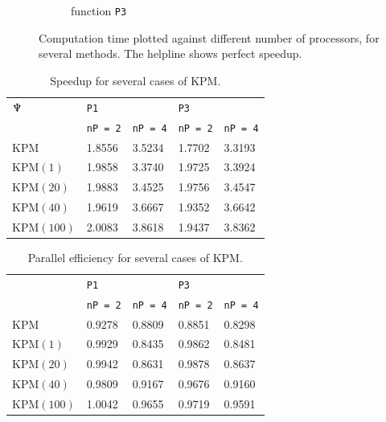 \begin{figure}[H]
\begin{subfigure}[b]{0.45\textwidth}
                \caption{function \texttt{P3}}
                \label{fig:speed2}
        \end{subfigure}
        \caption{Computation time plotted against different number of processors, for several methods. The helpline shows perfect speedup.}\label{fig:speed}

\end{figure}

\begin{table}[H]
\centering
\begin{tabular}{l | l l | l l}
$\neptune$ %
 &\texttt{P1} & & \texttt{P3} & \\
&\texttt{nP = 2} & \texttt{nP = 4} & \texttt{nP = 2} & \texttt{nP = 4} \\
\hline
KPM & 1.8556  &  3.5234 & 1.7702&    3.3193\\
KPM$(1)$ & 1.9858  &  3.3740 & 1.9725&    3.3924\\
KPM$(20)$ & 1.9883  &  3.4525 & 1.9756&    3.4547\\
KPM$(40)$ & 1.9619  &  3.6667 & 1.9352&   3.6642\\
KPM$(100)$ & 2.0083  &  3.8618 & 1.9437&    3.8362\\
\end{tabular}
\caption{Speedup for several cases of KPM.}
\label{tab:speedup}
\end{table}

\begin{table}[H]
\centering
\begin{tabular}{l | l l | l l}
&\texttt{P1} & & \texttt{P3} & \\
&\texttt{nP = 2} & \texttt{nP = 4} & \texttt{nP = 2} & \texttt{nP = 4} \\
\hline
KPM & 0.9278  &  0.8809 & 0.8851&    0.8298\\
KPM$(1)$ &  0.9929  &  0.8435 & 0.9862 &   0.8481\\
KPM$(20)$ & 0.9942  &  0.8631 & 0.9878&    0.8637\\
KPM$(40)$ & 0.9809  &  0.9167 & 0.9676&    0.9160\\
KPM$(100)$ & 1.0042  &  0.9655 & 0.9719&    0.9591\\
\end{tabular}
\caption{Parallel efficiency for several cases of KPM. }
\label{tab:eff}
\end{table}

